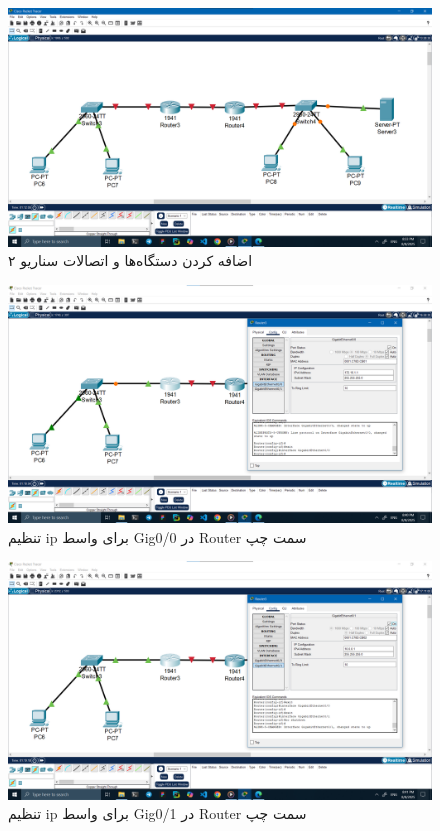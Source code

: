 \documentclass[12pt]{article}
\begin{document}
	\begin{figure}[H]
		\centering
		\includegraphics[width=\textwidth]{resources/scenario2-1.png}
		\caption{اضافه کردن دستگاه‌ها و اتصالات سناریو ۲}
		\label{2:1}
	\end{figure}
	\begin{figure}[H]
		\centering
		\includegraphics[width=\textwidth]{resources/scenario2-2.png}
		\caption{تنظیم \textenglish{ip} برای واسط \textenglish{Gig0/0} در \textenglish{Router} سمت چپ}
		\label{2:2}
	\end{figure}
	\begin{figure}[H]
		\centering
		\includegraphics[width=\textwidth]{resources/scenario2-3.png}
		\caption{تنظیم \textenglish{ip} برای واسط \textenglish{Gig0/1} در \textenglish{Router} سمت چپ}
		\label{2:3}
	\end{figure}
\end{document}
